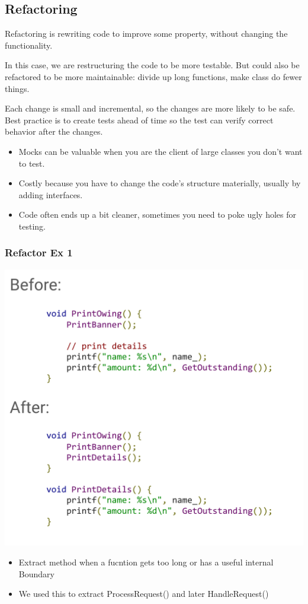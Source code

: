 \documentclass{article}
\begin{document}
\subsection{Refactoring}

Refactoring is rewriting code to improve some property, without changing the functionality.

\vspace*{1em}

In this case, we are restructuring the code to be more testable. But could also be refactored to be more maintainable: divide up long functions, make class do fewer things.

\vspace*{1em}

Each change is small and incremental, so the changes are more likely to be safe. Best practice is to create tests ahead of time so the test can verify correct behavior after the changes.
\begin{itemize}
    \item Mocks can be valuable when you are the client of large classes you don't want to test.
    \item Costly because you have to change the code's structure materially, usually by adding interfaces.
    \item Code often ends up a bit cleaner, sometimes you need to poke ugly holes for testing.
\end{itemize}

\subsubsection*{Refactor Ex 1}

\includegraphics*[width=0.6\linewidth]{refactorEx1.png}

\begin{center}
    \begin{itemize}
        \item Extract method when a fucntion gets too long or has a useful internal Boundary
        \item We used this to extract ProcessRequest() and later HandleRequest()
    \end{itemize}
\end{center}
\end{document}
